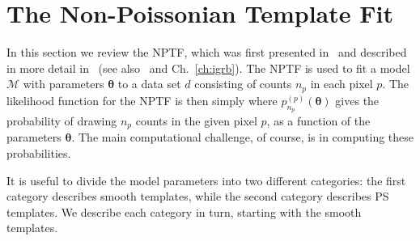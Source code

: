 \section{The Non-Poissonian Template Fit}
\label{NPTF}

In this section we review the NPTF, which was first presented in~\cite{Lee:2015fea} and described in more detail in~\cite{Linden:2016rcf,Lisanti:2016jub} (see also~\cite{Malyshev:2011zi,Lee:2014mza,Zechlin:2015wdz,Zechlin:2016pme} and Ch.~\ref{ch:igrb}).  The NPTF is used to fit a model $\mathcal{M}$ with parameters $\bm{\theta}$ to a data set $d$ consisting of counts $n_p$ in each pixel $p$.  The likelihood function for the NPTF is then simply
where $p_{n_p}^{(p)}( {\bm \theta})$ gives the probability of drawing $n_p$ counts in the given pixel $p$, as a function of the parameters $\bm{\theta}$.  The main computational challenge, of course, is in computing these probabilities.

It is useful to divide the model parameters into two different categories: the first category describes smooth templates, while the second category describes PS templates.  We describe each category in turn, starting with the smooth templates.  

